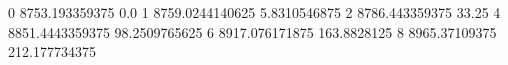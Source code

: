 0 8753.193359375 0.0
1 8759.0244140625 5.8310546875
2 8786.443359375 33.25
4 8851.4443359375 98.2509765625
6 8917.076171875 163.8828125
8 8965.37109375 212.177734375
